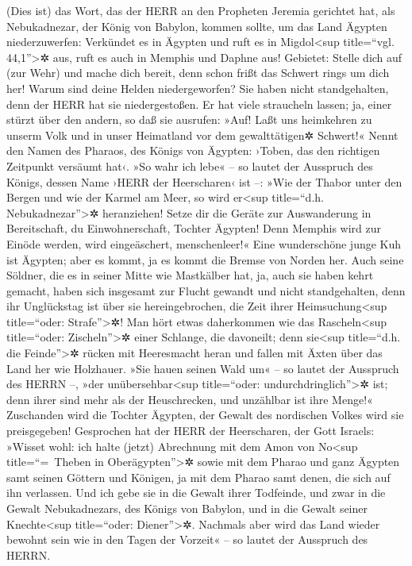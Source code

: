(Dies ist) das Wort, das der HERR an den Propheten
Jeremia gerichtet hat, als Nebukadnezar, der König von Babylon, kommen
sollte, um das Land Ägypten niederzuwerfen: Verkündet es
in Ägypten und ruft es in Migdol\textless sup title=``vgl.
44,1''\textgreater✲ aus, ruft es auch in Memphis und Daphne aus!
Gebietet: Stelle dich auf (zur Wehr) und mache dich bereit, denn schon
frißt das Schwert rings um dich her! Warum sind deine
Helden niedergeworfen? Sie haben nicht standgehalten, denn der HERR hat
sie niedergestoßen. Er hat viele straucheln lassen; ja,
einer stürzt über den andern, so daß sie ausrufen: »Auf! Laßt uns
heimkehren zu unserm Volk und in unser Heimatland vor dem gewalttätigen✲
Schwert!« Nennt den Namen des Pharaos, des Königs von
Ägypten: ›Toben, das den richtigen Zeitpunkt versäumt hat‹.
»So wahr ich lebe« -- so lautet der Ausspruch des Königs,
dessen Name ›HERR der Heerscharen‹ ist --: »Wie der Thabor unter den
Bergen und wie der Karmel am Meer, so wird er\textless sup title=``d.h.
Nebukadnezar''\textgreater✲ heranziehen! Setze dir die
Geräte zur Auswanderung in Bereitschaft, du Einwohnerschaft, Tochter
Ägypten! Denn Memphis wird zur Einöde werden, wird eingeäschert,
menschenleer!« Eine wunderschöne junge Kuh ist Ägypten;
aber es kommt, ja es kommt die Bremse von Norden her.
Auch seine Söldner, die es in seiner Mitte wie Mastkälber
hat, ja, auch sie haben kehrt gemacht, haben sich insgesamt zur Flucht
gewandt und nicht standgehalten, denn ihr Unglückstag ist über sie
hereingebrochen, die Zeit ihrer Heimsuchung\textless sup title=``oder:
Strafe''\textgreater✲! Man hört etwas daherkommen wie das
Rascheln\textless sup title=``oder: Zischeln''\textgreater✲ einer
Schlange, die davoneilt; denn sie\textless sup title=``d.h. die
Feinde''\textgreater✲ rücken mit Heeresmacht heran und fallen mit Äxten
über das Land her wie Holzhauer. »Sie hauen seinen Wald
um« -- so lautet der Ausspruch des HERRN --, »der
unübersehbar\textless sup title=``oder: undurchdringlich''\textgreater✲
ist; denn ihrer sind mehr als der Heuschrecken, und unzählbar ist ihre
Menge!« Zuschanden wird die Tochter Ägypten, der Gewalt
des nordischen Volkes wird sie preisgegeben! Gesprochen
hat der HERR der Heerscharen, der Gott Israels: »Wisset wohl: ich halte
(jetzt) Abrechnung mit dem Amon von No\textless sup title=``=~Theben in
Oberägypten''\textgreater✲ sowie mit dem Pharao und ganz Ägypten samt
seinen Göttern und Königen, ja mit dem Pharao samt denen, die sich auf
ihn verlassen. Und ich gebe sie in die Gewalt ihrer
Todfeinde, und zwar in die Gewalt Nebukadnezars, des Königs von Babylon,
und in die Gewalt seiner Knechte\textless sup title=``oder:
Diener''\textgreater✲. Nachmals aber wird das Land wieder bewohnt sein
wie in den Tagen der Vorzeit« -- so lautet der Ausspruch des HERRN.

